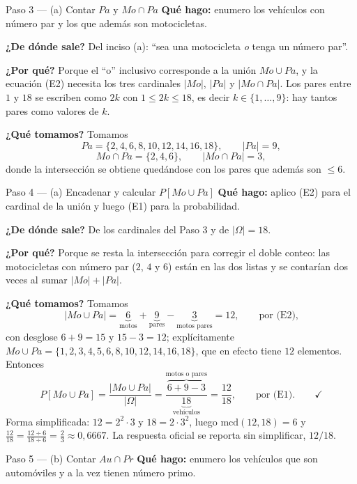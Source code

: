 \documentclass[11pt]{article}
\begin{document}
\begin{sol}
\begin{paso}{Paso 3 --- (a) Contar $Pa$ y $Mo\cap Pa$}
\textbf{Qué hago:} enumero los vehículos con número par y los que además son motocicletas.

\textbf{¿De dónde sale?} Del inciso (a): ``sea una motocicleta \emph{o} tenga un número par''.

\textbf{¿Por qué?} Porque el ``o'' inclusivo corresponde a la unión $Mo\cup Pa$, y la ecuación
(E2) necesita los tres cardinales $|Mo|$, $|Pa|$ y $|Mo\cap Pa|$. Los pares entre $1$ y $18$ se
escriben como $2k$ con $1\le 2k\le 18$, es decir $k\in\{1,\dots,9\}$: hay tantos pares como
valores de $k$.

\textbf{¿Qué tomamos?} Tomamos
\[
Pa=\{2,4,6,8,10,12,14,16,18\},\qquad |Pa|=9,
\]
\[
Mo\cap Pa=\{2,4,6\},\qquad |Mo\cap Pa|=3 ,
\]
donde la intersección se obtiene quedándose con los pares que además son $\le 6$.
\end{paso}

\begin{paso}{Paso 4 --- (a) Encadenar y calcular $P[Mo\cup Pa]$}
\textbf{Qué hago:} aplico (E2) para el cardinal de la unión y luego (E1) para la probabilidad.

\textbf{¿De dónde sale?} De los cardinales del Paso 3 y de $|\Omega|=18$.

\textbf{¿Por qué?} Porque se resta la intersección para corregir el doble conteo: las
motocicletas con número par ($2$, $4$ y $6$) están en las dos listas y se contarían dos veces al
sumar $|Mo|+|Pa|$.

\textbf{¿Qué tomamos?} Tomamos
\[
|Mo\cup Pa|=\underbrace{6}_{\text{motos}}+\underbrace{9}_{\text{pares}}
-\underbrace{3}_{\text{motos pares}}=12 , \qquad\text{por (E2),}
\]
con desglose $6+9=15$ y $15-3=12$; explícitamente
$Mo\cup Pa=\{1,2,3,4,5,6,8,10,12,14,16,18\}$, que en efecto tiene $12$ elementos. Entonces
\[
P[Mo\cup Pa]=\frac{|Mo\cup Pa|}{|\Omega|}
=\frac{\overbrace{6+9-3}^{\text{motos o pares}}}{\underbrace{18}_{\text{vehículos}}}
=\frac{12}{18} , \qquad\text{por (E1)} . \qquad\checkmark
\]
Forma simplificada: $12=2^{2}\cdot 3$ y $18=2\cdot 3^{2}$, luego $\mathrm{mcd}(12,18)=6$ y
$\frac{12}{18}=\frac{12\div 6}{18\div 6}=\frac{2}{3}\approx 0{,}6667$. La respuesta oficial se
reporta sin simplificar, $12/18$.
\end{paso}

\begin{paso}{Paso 5 --- (b) Contar $Au\cap Pr$}
\textbf{Qué hago:} enumero los vehículos que son automóviles y a la vez tienen número primo.


\end{paso}
\end{sol}
\end{document}
